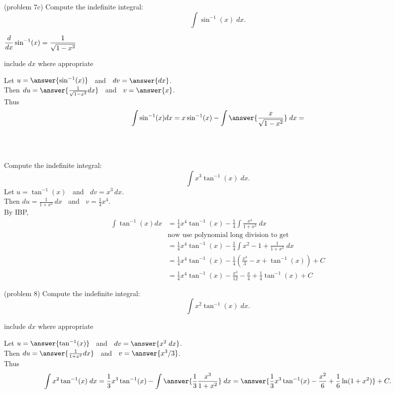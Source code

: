 \documentclass[handout]{ximera}
\begin{document}
\begin{problem}(problem 7c)
Compute the indefinite integral:
  \[
  \int \sin^{-1}(x) \;dx.
  \]
\begin{hint}
      $\displaystyle \frac{d}{dx} \sin^{-1}(x) = \frac{1}{\sqrt{1-x^2}}$
\end{hint}
\begin{hint}
      include $dx$ where appropriate
\end{hint}

  Let $u = \answer{\sin^{-1}(x)}\;\;$   and   $\;\;dv = \answer{dx}$.\\
  Then $du = \answer{\frac{1}{\sqrt{1-x^2}} dx}\;\;$   and   $\;\;v = \answer{x}$.\\
  Thus 
  \[
  \int \sin^{-1}(x) dx = x\sin^{-1}(x) - \int \answer{\frac{x}{\sqrt{1-x^2}}} \;dx  = 
  \]
 \begin{multipleChoice}
 \\
 \\
 \end{multipleChoice}
  
\end{problem}

\begin{example}[example 8]
Compute the indefinite integral:
  \[
  \int x^3\tan^{-1}(x) \;dx.
  \]
Let $u = \tan^{-1}(x)\;\;$   and   $\;\;dv = x^3 \, dx$.\\
  Then $du = \frac{1}{1+x^2}\, dx\;\;$   and   $\;\;v = \frac14 x^4$.\\
By IBP,
  \begin{align*}
  \int  \tan^{-1}(x) dx &= \frac14 x^4\tan^{-1}(x) - \frac14\int \frac{x^4}{1+x^2} \;dx\\
  & \text{now use polynomial long division to get} \\
  &= \frac14 x^4\tan^{-1}(x) - \frac14 \int x^2 - 1 + \frac{1}{1+x^2} \; dx\\
  &= \frac14 x^4\tan^{-1}(x) - \frac14\left(\frac{x^3}{3} - x + \tan^{-1}(x)\right) + C\\
  &= \frac14 x^4\tan^{-1}(x) - \frac{x^3}{12} - \frac{x}{4} + \frac14 \tan^{-1}(x) + C
  \end{align*}
  
\end{example}

\begin{problem}(problem 8)
Compute the indefinite integral:
  \[
  \int x^2\tan^{-1}(x) \;dx.
  \]
\begin{hint}
      include $dx$ where appropriate
  \end{hint}
  Let $u = \answer{\tan^{-1}(x)}\;\;$   and   $\;\;dv = \answer{x^2 \;dx}$.\\
  Then $du = \answer{\frac{1}{1+x^2} dx}\;\;$   and   $\;\;v = \answer{x^3/3}$.\\
  Thus 
  \[
  \int x^2 \tan^{-1}(x) \; dx = \frac13 x^3 \tan^{-1}(x) - \int \answer{\frac13 \frac{x^3}{1+x^2}} \;dx = 
  \answer{\frac13 x^3 \tan^{-1}(x) - \frac{x^2}{6} + \frac16\ln(1+x^2)} + C.
  \]
\end{problem}
\end{document}

